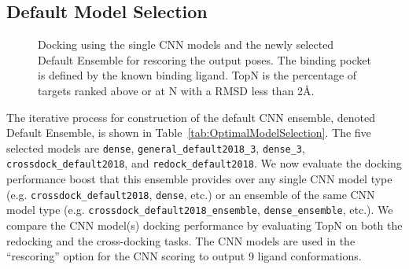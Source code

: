\documentclass[linenumbers,doublespacing]{bmcart}
\begin{document}
\subsection{Default Model Selection}
\begin{figure}[tbh]
	\caption{Docking using the single CNN models and the newly selected Default Ensemble for rescoring the output poses. The binding pocket is defined by the known binding ligand. TopN is the percentage of targets ranked above or at N with a RMSD less than 2{\AA}.}
	\label{fig:RescoreSingle}
\end{figure}

The iterative process for construction of the default CNN ensemble, denoted Default Ensemble, is shown in Table~\ref{tab:OptimalModelSelection}. The five selected models are \texttt{dense}, \texttt{general\_default2018\_3}, \texttt{dense\_3}, \texttt{crossdock\_default2018}, and \texttt{redock\_default2018}. We now evaluate the docking performance boost that this ensemble provides over any single CNN model type (e.g. \texttt{crossdock\_default2018}, \texttt{dense}, etc.) or an ensemble of the same CNN model type (e.g. \texttt{crossdock\_default2018\_ensemble}, \texttt{dense\_ensemble}, etc.). We compare the CNN model(s) docking performance by evaluating TopN on both the redocking and the cross-docking tasks. The CNN models are used in the ``rescoring'' option for the CNN scoring to output 9 ligand conformations. 
\end{document}

